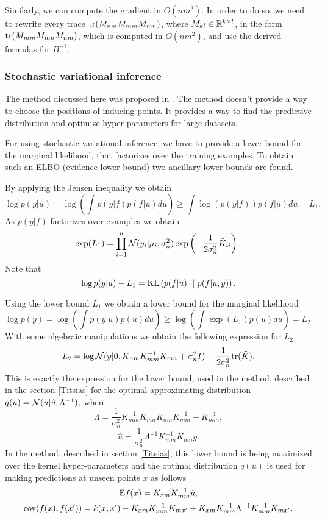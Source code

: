 \documentclass[12pt]{article}
\begin{document}
		Similarly, we can compute the gradient in $O(nm^2)$. In order to do so, we need to rewrite every trace $\mbox{tr}(M_{nm} M_{mm} M_{mn})$, where $M_{kl} \in \mathbb{R}^{k \times l}$, in the form $\mbox{tr}(M_{mm} M_{mn} M_{nm})$, which is computed in $O(nm^2)$, and use the derived formulas for $B^{-1}$.


	\pagebreak
	\subsubsection{Stochastic variational inference}
		\label{svi}
	
		\hspace{0.6cm}The method discussed here was proposed in \cite{BigData}. The method doesn't provide a way to choose the positions of inducing points. It provides a way to find the predictive distribution and optimize hyper-parameters for large datasets.
		
		For using stochastic variational inference, we have to provide a lower bound for the marginal likelihood, that factorizes over the training examples. To obtain such an ELBO (evidence lower bound) two ancillary lower bounds are found. 
		
		By applying the Jensen inequality we obtain
		$$ \log p(y | u) = \log \left ( \int p(y|f) p(f | u) du\right) \ge  \int \log (p(y|f)) p(f | u) du = L_1.$$	
		As $p(y | f)$ factorizes over examples we obtain
		$$\exp(L_1) = \prod_{i = 1}^{n} \mathcal{N}(y_i| \mu_i, \sigma_n^2) \exp \left( -\frac 1 {2\sigma_n^2} \tilde K_{ii}\right).$$
		Note that 
		$$\log p(y | u) - L_1 = \mbox{KL}\left(p(f | u)\mbox{ || }p(f | u, y)\right).$$
		
		Using the lower bound $L_1$ we obtain a lower bound for the marginal likelihood
		$$\log p(y) = \log \left( \int p(y|u) p(u) du\right) \ge \log \left( \int \exp(L_1) p(u) du\right) = L_2.$$
		With some algebraic manipulations we obtain the following expression for $L_2$
		$$L_2 = \log \mathcal{N}(y| 0, K_{nm} K_{mm}^{-1} K_{mn} + \sigma_n^2 I) - \frac 1 {2 \sigma_n^2} \mbox{tr} (\tilde K).$$
		This is exactly the expression for the lower bound, used in the method, described in the section \ref{Titsias} for the optimal approximating distribution $q(u) = \mathcal{N}(u |\hat u, \Lambda^{-1}),$ where
		$$\Lambda = \frac 1 {\sigma_n^2} K_{mm}^{-1} K_{mn} K_{nm} K_{mm}^{-1} + K_{mm}^{-1},$$
		$$\hat u = \frac 1 {\sigma_n^2} \Lambda^{-1} K_{mm}^{-1} K_{mn} y.$$
		In the method, described in section \ref{Titsias}, this lower bound is being maximized over the kernel hyper-parameters and the optimal distribution $q(u)$ is used for making predictions at unseen points $x$ as follows
		$$\mathbb{E} f(x) = K_{xm} K_{mm}^{-1} \hat u, $$
		$$\mbox{cov}(f(x), f(x')) = k(x, x') - K_{xm} K_{mm}^{-1} K_{mx'} + K_{xm} K_{mm}^{-1} \Lambda^{-1} K_{mm}^{-1} K_{mx'}.$$
		
\end{document}
